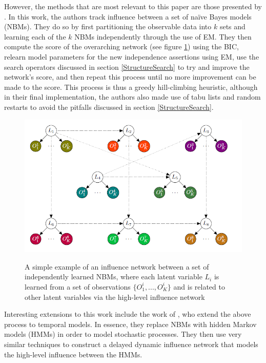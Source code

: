 \documentclass [11pt]{article}
\begin{document}
However, the methods that are most relevant to this paper are those presented by \cite{ajoodha17}. In this work, the authors track influence between a set of na\"{i}ve Bayes models (NBMs). They do so by first partitioning the observable data into $k$ sets and learning each of the $k$ NBMs independently through the use of EM. They then compute the score of the overarching network (see figure \ref{fig:ajoodha}) using the BIC, relearn model parameters for the new independence assertions using EM, use the search operators discussed in section \ref{StructureSearch} to try and improve the network's score, and then repeat this process until no more improvement can be made to the score. This process is thus a greedy hill-climbing heuristic, although in their final implementation, the authors also made use of tabu lists and random restarts to avoid the pitfalls discussed in section \ref{StructureSearch}.
\begin{figure}[H]
\centering
\caption{A simple example of an influence network between a set of independently learned NBMs, where each latent variable $L_{i}$ is learned from a set of observations $\{O_{1}^{i},...,O_{K}^{i}\}$ and is related to other latent variables via the high-level influence network \citep{ajoodha17}}
\includegraphics[width=12cm]{ajoodha.png}\label{fig:ajoodha}
\end{figure}
Interesting extensions to this work include the work of \cite{ajoodha18}, who extend the above process to temporal models. In essence, they replace NBMs with hidden Markov models (HMMs) in order to model stochastic processes. They then use very similar techniques to construct a delayed dynamic influence network that models the high-level influence between the HMMs.
\end{document}
